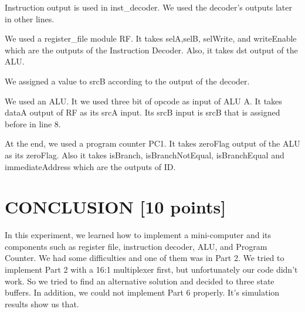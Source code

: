\documentclass[pdftex,12pt,a4paper]{article}
\begin{document}
Instruction output is used in inst\_decoder. We used the decoder's outputs later in other lines. 

We used a register\_file module RF. It takes selA,selB, selWrite, and writeEnable which are the outputs of the Instruction Decoder. Also, it takes dst output of the ALU.

We assigned a value to srcB according to the output of the decoder. 

We used an ALU. It we used three bit of opcode as input of ALU A. It takes dataA output of RF as its srcA input. Its srcB input is srcB that is assigned before in line 8.

At the end, we used a program counter PC1. It takes zeroFlag output of the ALU as its zeroFlag. Also it takes isBranch, isBranchNotEqual, isBranchEqual and  immediateAddress which are the outputs of ID.


\section{CONCLUSION [10 points]}
In this experiment, we learned how to implement a mini-computer and its components such as register file, instruction decoder, ALU, and Program Counter. We had some difficulties and one of them was in Part 2. We tried to implement Part 2 with a 16:1 multiplexer first, but unfortunately our code didn't work. So we tried to find an alternative solution and decided to three state buffers. In addition, we could not implement Part 6 properly. It's simulation results show us that.
 
\end{document}
